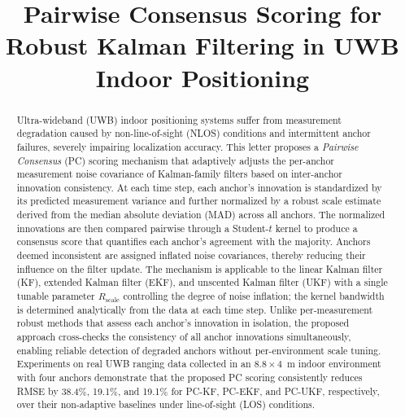 \documentclass[journal]{IEEEtran}
\begin{document}
\title{Pairwise Consensus Scoring for Robust Kalman Filtering in UWB Indoor Positioning}

\author{
}

\maketitle

\begin{abstract}
Ultra-wideband (UWB) indoor positioning systems suffer from measurement degradation caused by non-line-of-sight (NLOS) conditions and intermittent anchor failures, severely impairing localization accuracy. This letter proposes a \emph{Pairwise Consensus} (PC) scoring mechanism that adaptively adjusts the per-anchor measurement noise covariance of Kalman-family filters based on inter-anchor innovation consistency. At each time step, each anchor's innovation is standardized by its predicted measurement variance and further normalized by a robust scale estimate derived from the median absolute deviation (MAD) across all anchors. The normalized innovations are then compared pairwise through a Student-$t$ kernel to produce a consensus score that quantifies each anchor's agreement with the majority. Anchors deemed inconsistent are assigned inflated noise covariances, thereby reducing their influence on the filter update. The mechanism is applicable to the linear Kalman filter (KF), extended Kalman filter (EKF), and unscented Kalman filter (UKF) with a single tunable parameter $R_{\text{scale}}$ controlling the degree of noise inflation; the kernel bandwidth is determined analytically from the data at each time step. Unlike per-measurement robust methods that assess each anchor's innovation in isolation, the proposed approach cross-checks the consistency of all anchor innovations simultaneously, enabling reliable detection of degraded anchors without per-environment scale tuning. Experiments on real UWB ranging data collected in an $8.8\times4$~m indoor environment with four anchors demonstrate that the proposed PC scoring consistently reduces RMSE by 38.4\%, 19.1\%, and 19.1\% for PC-KF, PC-EKF, and PC-UKF, respectively, over their non-adaptive baselines under line-of-sight (LOS) conditions.
\end{abstract}
\end{document}
